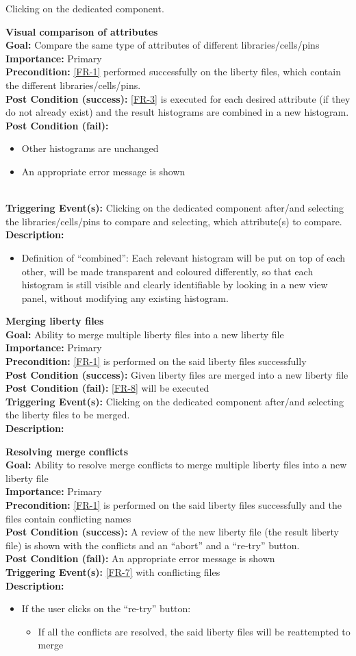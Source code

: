 \documentclass[10pt,a4paper]{report}
\newcommand{\FRDescription}[8]{
    \textbf{#1} \\
    \textbf{Goal: } #2 \\
    \textbf{Importance: } #3 \\
    \textbf{Precondition: } #4 \\
    \textbf{Post Condition (success): } #5 \\
    \textbf{Post Condition (fail): } #6 \\
    \textbf{Triggering Event(s): } #7 \\
    \textbf{Description: } \\ 
    #8}
\begin{document}
\begin{FR}
{    }
    {Clicking on the dedicated component.}
    \item \FRDescription{Visual comparison of attributes}
    {Compare the same type of attributes of different libraries/cells/pins}
    {Primary}
    {\ref{FR-1} performed successfully on the liberty files, which contain the different libraries/cells/pins.}
    {\ref{FR-3} is executed for each desired attribute (if they do not already exist) and the result histograms are combined in a new histogram.}
    {
    \begin{itemize}
        \item Other histograms are unchanged
        \item An appropriate error message is shown
    \end{itemize}
    }
    {Clicking on the dedicated component after/and selecting the libraries/cells/pins to compare and selecting, which attribute(s) to compare.}
    {\begin{itemize}
        \item Definition of “combined”: Each relevant histogram will be put on top of each other, will be made transparent and coloured differently, so that each histogram is still visible and clearly identifiable by looking in a new view panel, without modifying any existing histogram.
    \end{itemize}}
    \item \FRDescription{Merging liberty files}
    {Ability to merge multiple liberty files into a new liberty file}
    {Primary}
    {\ref{FR-1} is performed on the said liberty files successfully}
    {Given liberty files are merged into a new liberty file}
    {\ref{FR-8} will be executed}
    {Clicking on the dedicated component after/and selecting the liberty files to be merged.}
    \item \FRDescription{Resolving merge conflicts}
    {Ability to resolve merge conflicts to merge multiple liberty files into a new liberty file}
    {Primary}
    {\ref{FR-1} is performed on the said liberty files successfully and the files contain conflicting names}
    {A review of the new liberty file (the result liberty file) is shown with the conflicts and an “abort” and a “re-try” button.}
    {An appropriate error message is shown}
    {\ref{FR-7} with conflicting files}
    {\begin{itemize}
        \item If the user clicks on the “re-try” button:
        \begin{itemize}
            \item If all the conflicts are resolved, the said liberty files will be reattempted to merge

\end{itemize}
\end{itemize}}
\end{FR}
\end{document}

